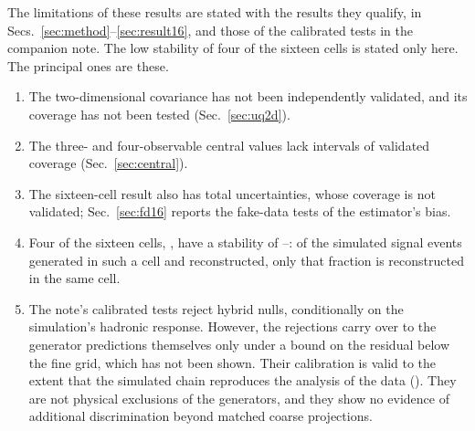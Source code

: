 The limitations of these results are stated with the results they qualify, in
Secs.~\ref{sec:method}--\ref{sec:result16}, and those of the calibrated tests in the companion note.
The low stability of four of the sixteen cells is stated only here.
The principal ones are these.
\begin{enumerate}
\item The two-dimensional covariance has not been independently validated, and its coverage has not been tested
(Sec.~\ref{sec:uq2d}).
\item The three- and four-observable central values lack intervals of validated coverage (Sec.~\ref{sec:central}).
\item The sixteen-cell result also has total uncertainties, whose coverage is not validated; Sec.~\ref{sec:fd16}
reports the fake-data tests of the estimator's bias.
\item Four of the sixteen cells, , have a stability of
--: of the simulated signal events generated in such a cell and
reconstructed, only that fraction is reconstructed in the same cell.
\item The note's calibrated tests reject hybrid nulls, conditionally on the simulation's hadronic response.
However, the rejections carry over to the generator predictions themselves only under a bound on the residual below
the fine grid, which has not been shown.
Their calibration is valid to the extent that the simulated chain reproduces the analysis of the data
().
They are not physical exclusions of the generators, and they show no evidence of additional discrimination beyond
matched coarse projections.
\end{enumerate}
